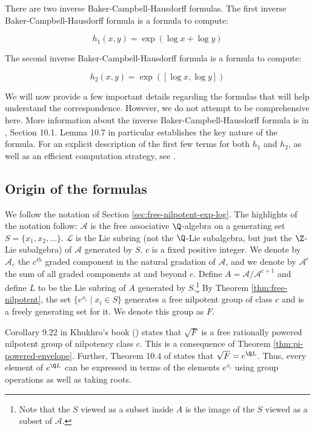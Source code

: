 \documentclass{ucetd}
\begin{document}
There are two inverse Baker-Campbell-Hausdorff formulas. The first
inverse Baker-Campbell-Hausdorff formula is a formula to compute:

$$h_1(x,y) = \exp(\log x + \log y)$$

The second inverse Baker-Campbell-Hausdorff formula is a formula to
compute:

$$h_2(x,y) =\exp([\log x, \log y])$$

We will now provide a few important details regarding the formulas
that will help understand the correspondence. However, we do not
attempt to be comprehensive here. More information about the inverse
Baker-Campbell-Hausdorff formula is in \cite{Khukhro}, Section
10.1. Lemma 10.7 in particular establishes the key nature of the
formula. For an explicit description of the first few terms for both
$h_1$ and $h_2$, as well as an efficient computation strategy, see
\cite{Lazardeffective}.


\subsection{Origin of the formulas}\label{sec:inverse-bch-origins}

We follow the notation of Section
\ref{sec:free-nilpotent-exp-log}. The highlights of the notation
follow: $\mathcal{A}$ is the free associative $\Q$-algebra on a
generating set $S = \{ x_1,x_2,\dots \}.$ $\mathcal{L}$ is the Lie
subring (not the $\Q$-Lie subalgebra, but just the $\Z$-Lie
subalgebra) of $\mathcal{A}$ generated by $S$. $c$ is a fixed positive
integer. We denote by $\mathcal{A}_c$ the $c^{th}$ graded component in
the natural gradation of $\mathcal{A}$, and we denote by
$\mathcal{A}^c$ the sum of all graded components at and beyond
$c$. Define $A = \mathcal{A}/\mathcal{A}^{c+1}$ and define $L$ to be
the Lie subring of $A$ generated by $S$.\footnote{Note that the $S$
  viewed as a subset inside $A$ is the image of the $S$ viewed as a
  subset of $\mathcal{A}$.} By Theorem \ref{thm:free-nilpotent}, the
set $\{ e^{x_i} \mid x_i \in S \}$ generates a free nilpotent group of
class $c$ and is a freely generating set for it. We denote this group
as $F$.

Corollary 9.22 in Khukhro's book (\cite{Khukhro}) states that
$\sqrt{F}$ is a free rationally powered nilpotent group of nilpotency
class $c$. This is a consequence of Theorem
\ref{thm:pi-powered-envelope}. Further, Theorem 10.4 of \cite{Khukhro}
states that $\sqrt{F} = e^{\Q L}$. Thus, every element of $e^{\Q L}$
can be expressed in terms of the elements $e^{x_i}$ using group
operations as well as taking roots.
\end{document}
